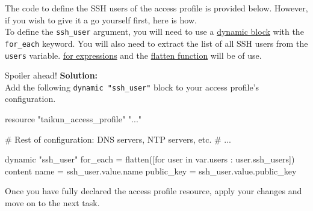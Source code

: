 \begin{note}
The code to define the SSH users of the access profile is provided below.
However, if you wish to give it a go yourself first, here is how.\\

To define the \texttt{ssh\_user} argument, you will need to use a
\href{https://www.terraform.io/docs/language/expressions/dynamic-blocks.html}{dynamic block}
with the \texttt{for\_each} keyword.
You will also need to extract the list of all SSH users from the \texttt{users} variable.
\href{https://www.terraform.io/docs/language/expressions/for.html}{for expressions} and
the \href{https://www.terraform.io/docs/language/functions/flatten.html}{flatten function}
will be of use.
\end{note}
\vfill
{\Large{Spoiler ahead!}}
\vfill
\textbf{Solution:}\\
Add the following \texttt{dynamic "ssh\_user"} block to your access profile's
configuration.
\begin{tf}
resource "taikun_access_profile" "..." {

  # Rest of configuration: DNS servers, NTP servers, etc.
  # ...
  
  dynamic "ssh_user" {
    for_each = flatten([for user in var.users : user.ssh_users])
    content {
      name       = ssh_user.value.name
      public_key = ssh_user.value.public_key
    }
  }
}
\end{tf}

Once you have fully declared the access profile resource, apply your changes and move on to the next task.

